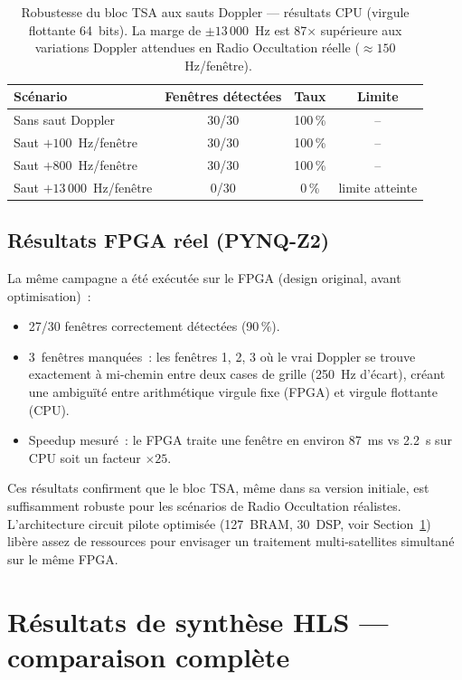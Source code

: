 \documentclass[11pt,a4paper]{article}
\begin{document}
\begin{table}[H]
\centering
\renewcommand{\arraystretch}{1.3}
\begin{tabular}{lccc}
\toprule
\textbf{Scénario} & \textbf{Fenêtres détectées} & \textbf{Taux} & \textbf{Limite} \\
\midrule
Sans saut Doppler        & 30/30 & 100\,\% & -- \\
Saut $+100$~Hz/fenêtre   & 30/30 & 100\,\% & -- \\
Saut $+800$~Hz/fenêtre   & 30/30 & 100\,\% & -- \\
Saut $+13\,000$~Hz/fenêtre & 0/30 & 0\,\% & limite atteinte \\
\bottomrule
\end{tabular}
\caption{Robustesse du bloc TSA aux sauts Doppler --- résultats CPU (virgule flottante 64~bits). La marge de $\pm13\,000$~Hz est 87× supérieure aux variations Doppler attendues en Radio Occultation réelle ($\approx150$~Hz/fenêtre).}
\end{table}

\subsection{Résultats FPGA réel (PYNQ-Z2)}

La même campagne a été exécutée sur le FPGA (design original, avant optimisation)~:
\begin{itemize}
  \item 27/30 fenêtres correctement détectées (90\,\%).
  \item 3~fenêtres manquées~: les fenêtres 1, 2, 3 où le vrai Doppler se trouve exactement à mi-chemin entre deux cases de grille (250~Hz d'écart), créant une ambiguïté entre arithmétique virgule fixe (FPGA) et virgule flottante (CPU).
  \item Speedup mesuré~: le FPGA traite une fenêtre en environ 87~ms vs 2.2~s sur CPU soit un facteur $\times25$.
\end{itemize}

Ces résultats confirment que le bloc TSA, même dans sa version initiale, est suffisamment robuste pour les scénarios de Radio Occultation réalistes. L'architecture circuit pilote optimisée (127~BRAM, 30~DSP, voir Section~\ref{sec:resultats-synthese}) libère assez de ressources pour envisager un traitement multi-satellites simultané sur le même FPGA.

\section{Résultats de synthèse HLS --- comparaison complète}
\label{sec:resultats-synthese}
\end{document}
